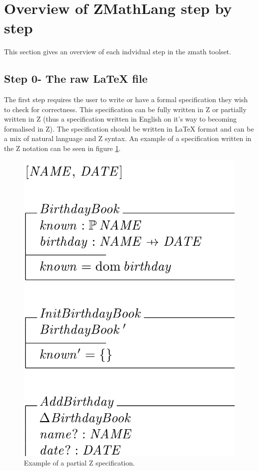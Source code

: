 \section{Overview of ZMathLang step by step}

This section gives an overview of each indvidual step in the \gls{zmath} toolset.

\subsection{Step 0- The raw LaTeX file}

The first step requires the user to write or have a formal specification they wish to check for correctness. This specification can be fully written in Z or partially written in Z (thus a specification written in English on it's way to becoming formalised in Z). The specification should be written in \LaTeX{} format and can be a mix of natural language and Z syntax. An example of a specification written in the Z notation can be seen in figure \ref{fig:zexample}.

\begin{figure}[H]
 \begin{center}
 \includegraphics [scale=0.25]{Figures/Design/zspec.png}
 \caption{Example of a partial Z specification.}
 \label{fig:zexample}
\end{center}
\end{figure} 

